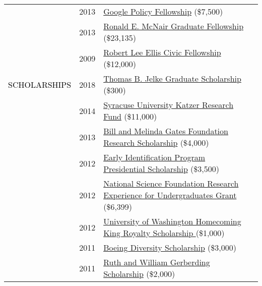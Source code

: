 \documentclass[12pt]{article}
\begin{document}
{{\begin{longtable}{Rp{1.0in}p{0.25in}p{4.75in}}
& \footnotesize{2013} & \href{https://www.google.com/policyfellowship/2013fellows.html}{{Google Policy Fellowship}} (\$7,500) \\

& \footnotesize{2013} & \href{https://www.syracuse.edu/admissions/cost-and-aid/types-of-aid/graduate-student-aid/fellowships/}{{Ronald E. McNair Graduate Fellowship}} (\$23,135) \\

& \footnotesize{2009} & \href{http://www.washington.edu/carlson/ellis-civic-fellowship/}{{Robert Lee Ellis Civic Fellowship}} (\$12,000) \\

\textcolor{black}{\footnotesize{\uppercase{Scholarships}}} & \footnotesize{2018} & \href{https://www.afa1976.org/foundation}{{Thomas B. Jelke Graduate Scholarship}} (\$300) \\

& \footnotesize{2014} & \href{https://youtu.be/kFmO44rs3-c}{{Syracuse University Katzer Research Fund}} (\$11,000) \\

& \footnotesize{2013} & \href{https://expo.uw.edu/public/offering/271}{{Bill and Melinda Gates Foundation Research Scholarship}} (\$4,000) \\

& \footnotesize{2012} & \href{http://depts.washington.edu/eip/}{{Early Identification Program Presidential Scholarship}} (\$3,500) \\

& \footnotesize{2012} & \href{http://www.nsf.gov/crssprgm/reu/}{{National Science Foundation Research Experience for Undergraduates Grant}} (\$6,399) \\

& \footnotesize{2012} & \href{http://www.washington.edu/uaa/2013/06/28/oh-the-places-theyll-go-new-grads-and-their-plans/bryan-dosono/}{{University of Washington Homecoming King Royalty Scholarship }}(\$1,000) \\

& \footnotesize{2011} & \href{https://ischool.uw.edu/news/2012/04/bryan-dosono-informatics-student-speaks-boeing-scholarship-breakfast}{{Boeing Diversity Scholarship}} (\$3,000) \\

& \footnotesize{2011} & \href{http://www.washington.edu/omad/2011/05/17/assunta-ng-student-scholars-honored-at-41st-annual-eop-celebration/}{{Ruth and William Gerberding Scholarship}} (\$2,000) \\


\end{longtable}}}
\end{document}
